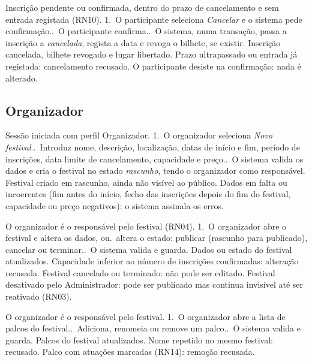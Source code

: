 {Inscrição pendente ou confirmada, dentro do prazo de cancelamento e sem
 entrada registada (RN10).}
{1.~O participante seleciona \emph{Cancelar} e o sistema pede
 confirmação..~O participante confirma..~O sistema, numa transação, passa a inscrição a \emph{cancelada}, regista a
 data e revoga o bilhete, se existir.}
{Inscrição cancelada, bilhete revogado e lugar libertado.}
{Prazo ultrapassado ou entrada já registada: cancelamento recusado.
 O participante desiste na confirmação: nada é alterado.}

\subsection{Organizador}

{Sessão iniciada com perfil Organizador.}
{1.~O organizador seleciona \emph{Novo festival}..~Introduz nome, descrição, localização, datas de início e fim, período
 de inscrições, data limite de cancelamento, capacidade e preço..~O sistema valida os dados e cria o festival no estado \emph{rascunho},
 tendo o organizador como responsável.}
{Festival criado em rascunho, ainda não visível ao público.}
{Dados em falta ou incoerentes (fim antes do início, fecho das inscrições
 depois do fim do festival, capacidade ou preço negativos): o sistema
 assinala os erros.}

{O organizador é o responsável pelo festival (RN04).}
{1.~O organizador abre o festival e altera os dados, ou.~altera o estado: publicar (rascunho para publicado), cancelar ou
 terminar..~O sistema valida e guarda.}
{Dados ou estado do festival atualizados.}
{Capacidade inferior ao número de inscrições confirmadas: alteração recusada.
 Festival cancelado ou terminado: não pode ser editado.
 Festival desativado pelo Administrador: pode ser publicado mas continua
 invisível até ser reativado (RN03).}

{O organizador é o responsável pelo festival.}
{1.~O organizador abre a lista de palcos do festival..~Adiciona, renomeia ou remove um palco..~O sistema valida e guarda.}
{Palcos do festival atualizados.}
{Nome repetido no mesmo festival: recusado.
 Palco com atuações marcadas (RN14): remoção recusada.}

